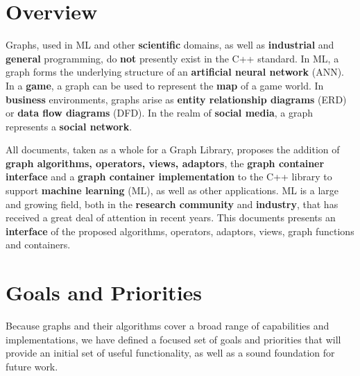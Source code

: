 
\section{Overview}

Graphs, used in ML and other \textbf{scientific} domains, as well as \textbf{industrial} and \textbf{general} programming, 
do \textbf{not} presently exist in the C++ standard. In ML, a graph forms the underlying structure of an \textbf{artificial neural network} (ANN). 
In a \textbf{game}, a graph can be used to represent the \textbf{map} of a game world. In \textbf{business} environments, graphs arise as 
\textbf{entity relationship diagrams} (ERD) or \textbf{data flow diagrams} (DFD). In the realm of \textbf{social media}, a graph represents a 
\textbf{social network}.

All documents, taken as a whole for a Graph Library, proposes the addition of \textbf{graph algorithms, operators, views, adaptors}, the 
\textbf{graph container interface} and a \textbf{graph container implementation} to the C++ library to support \textbf{machine learning} (ML), 
as well as other applications. ML is a large and growing field, both in the \textbf{research community} and \textbf{industry}, that has 
received a great deal of attention in recent years. This documents presents an \textbf{interface} of the proposed algorithms, operators, adaptors,
views, graph functions and containers.

\section{Goals and Priorities}

Because graphs and their algorithms cover a broad range of capabilities and implementations, we have defined a focused set of 
goals and priorities that will provide an initial set of useful functionality, as well as a sound foundation for future work.

